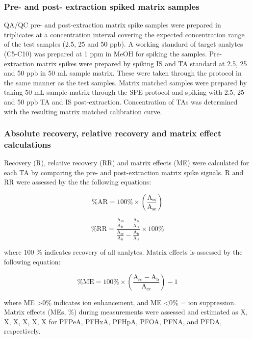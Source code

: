 \subsubsection{Pre- and post- extraction spiked matrix samples}
QA/QC pre- and post-extraction matrix spike samples were prepared in triplicates at a concentration interval covering the expected concentration range of the test samples (2.5, 25 and 50 ppb). A working standard of target analytes (C5-C10) was prepared at 1 ppm in MeOH for spiking the samples. Pre-extraction matrix spikes were prepared by spiking IS and TA standard at 2.5, 25 and 50 ppb in 50 mL sample matrix. These were taken through the protocol in the same manner as the test samples. Matrix matched samples were prepared by taking 50 mL sample matrix through the SPE protocol and spiking with 2.5, 25 and 50 ppb TA and IS post-extraction. Concentration of TAs was determined with the resulting matrix matched calibration curve. 

\subsubsection{Absolute recovery, relative recovery and matrix effect calculations}
Recovery (R), relative recovery (RR) and matrix effects (ME) were calculated for each TA by comparing the pre- and post-extraction matrix spike signals. R and RR were assessed by the the following equations:

\begin{equation}
    \label{eq:Recovery}
    \mathrm{\% AR  = 100 \% \times \left ( \frac{A_{ss}}{A_{se}} \right ) }
\end{equation}

\begin{equation}
    \label{eq:relativeRecovery}
    \mathrm{\% RR = \frac{\frac{A_{ss}}{A_{is}}-\frac{A_{b}}{A_{is}}}{\frac{A_{se}}{A_{is}}-\frac{A_{b}}{A_{is}}}\times 100 \% }
\end{equation}

where 100 \% indicates recovery of all analytes. Matrix effects is assessed by the following equation:

\begin{equation}
    \label{eq:ME}
    \mathrm{\% ME = 100 \% \times \left(\frac{A_{se} - A_b}{A_{cc}}\right )-1 }
\end{equation}

where ME \textgreater 0\% indicates ion enhancement, and ME \textless 0\% = ion suppression. Matrix effects (MEs, \%) during measurements were assessed and estimated as X, X, X, X, X, X for PFPeA, PFHxA, PFHpA, PFOA, PFNA, and PFDA, respectively.

